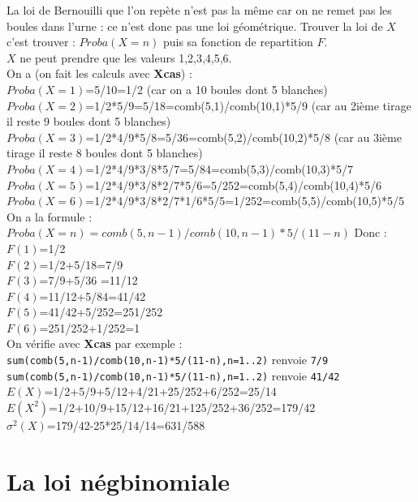 \documentclass[a4paper,11pt]{book}
\begin{document}
La loi de Bernouilli que l'on rep\`ete n'est pas la m\^eme car on ne remet  
pas les boules dans l'urne : ce n'est donc pas une loi g\'eom\'etrique.
Trouver la loi de $X$ c'est trouver :
$Proba(X=n)$ puis sa fonction de repartition $F$.\\
$X$ ne peut prendre que les valeurs 1,2,3,4,5,6.\\
On a (on fait les calculs avec {\bf Xcas}) :\\
$Proba(X=1)$=5/10=1/2  (car on a 10 boules dont 5 blanches)\\
$Proba(X=2)$=1/2*5/9=5/18=comb(5,1)/comb(10,1)*5/9 (car au 2i\`eme tirage il 
reste 9 boules dont 5 blanches)\\
$Proba(X=3)$=1/2*4/9*5/8=5/36=comb(5,2)/comb(10,2)*5/8  (car au 3i\`eme tirage 
il reste 8 boules dont 5 blanches)\\
$Proba(X=4)$=1/2*4/9*3/8*5/7=5/84=comb(5,3)/comb(10,3)*5/7\\
$Proba(X=5)$=1/2*4/9*3/8*2/7*5/6=5/252=comb(5,4)/comb(10,4)*5/6\\
$Proba(X=6)$=1/2*4/9*3/8*2/7*1/6*5/5=1/252=comb(5,5)/comb(10,5)*5/5\\
On a la formule :
$Proba(X=n)=comb(5,n-1)/comb(10,n-1)*5/(11-n)$
Donc :\\
$F(1)$=1/2\\
$F(2)$=1/2+5/18=7/9\\
$F(3)$=7/9+5/36 =11/12\\
$F(4)$=11/12+5/84=41/42\\
$F(5)$=41/42+5/252=251/252\\
$F(6)$=251/252+1/252=1\\
On v\'erifie avec {\bf Xcas} par exemple :\\
{\tt sum(comb(5,n-1)/comb(10,n-1)*5/(11-n),n=1..2)} renvoie {\tt 7/9}\\
{\tt sum(comb(5,n-1)/comb(10,n-1)*5/(11-n),n=1..2)} renvoie {\tt 41/42}\\
$E(X)$=1/2+5/9+5/12+4/21+25/252+6/252=25/14\\
$E(X^2)$=1/2+10/9+15/12+16/21+125/252+36/252=179/42\\
$\sigma^2(X)$=179/42-25*25/14/14=631/588
\section{La loi n\'egbinomiale}
\end{document}
